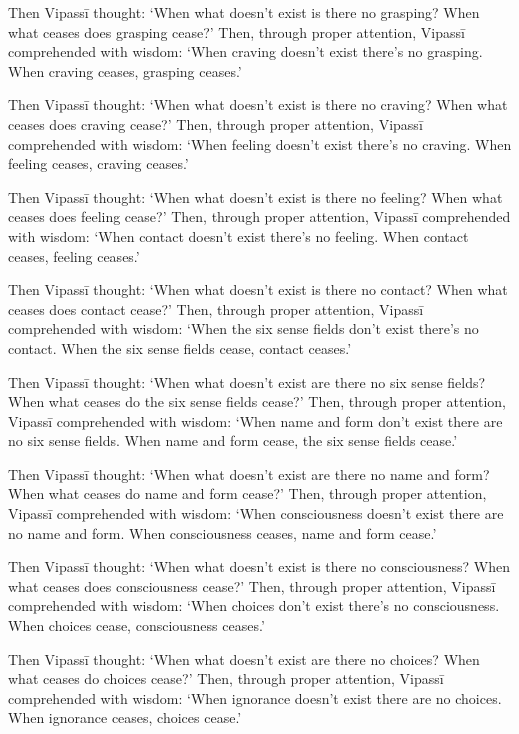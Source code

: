 \documentclass[12pt,openany]{book}%
\begin{document}
Then \textsanskrit{Vipassī} thought: ‘When what doesn’t exist is there no grasping? When what ceases does grasping cease?’ Then, through proper attention, \textsanskrit{Vipassī} comprehended with wisdom: ‘When craving doesn’t exist there’s no grasping. When craving ceases, grasping ceases.’ 

Then \textsanskrit{Vipassī} thought: ‘When what doesn’t exist is there no craving? When what ceases does craving cease?’ Then, through proper attention, \textsanskrit{Vipassī} comprehended with wisdom: ‘When feeling doesn’t exist there’s no craving. When feeling ceases, craving ceases.’ 

Then \textsanskrit{Vipassī} thought: ‘When what doesn’t exist is there no feeling? When what ceases does feeling cease?’ Then, through proper attention, \textsanskrit{Vipassī} comprehended with wisdom: ‘When contact doesn’t exist there’s no feeling. When contact ceases, feeling ceases.’ 

Then \textsanskrit{Vipassī} thought: ‘When what doesn’t exist is there no contact? When what ceases does contact cease?’ Then, through proper attention, \textsanskrit{Vipassī} comprehended with wisdom: ‘When the six sense fields don’t exist there’s no contact. When the six sense fields cease, contact ceases.’ 

Then \textsanskrit{Vipassī} thought: ‘When what doesn’t exist are there no six sense fields? When what ceases do the six sense fields cease?’ Then, through proper attention, \textsanskrit{Vipassī} comprehended with wisdom: ‘When name and form don’t exist there are no six sense fields. When name and form cease, the six sense fields cease.’ 

Then \textsanskrit{Vipassī} thought: ‘When what doesn’t exist are there no name and form? When what ceases do name and form cease?’ Then, through proper attention, \textsanskrit{Vipassī} comprehended with wisdom: ‘When consciousness doesn’t exist there are no name and form. When consciousness ceases, name and form cease.’ 

Then \textsanskrit{Vipassī} thought: ‘When what doesn’t exist is there no consciousness? When what ceases does consciousness cease?’ Then, through proper attention, \textsanskrit{Vipassī} comprehended with wisdom: ‘When choices don’t exist there’s no consciousness. When choices cease, consciousness ceases.’ 

Then \textsanskrit{Vipassī} thought: ‘When what doesn’t exist are there no choices? When what ceases do choices cease?’ Then, through proper attention, \textsanskrit{Vipassī} comprehended with wisdom: ‘When ignorance doesn’t exist there are no choices. When ignorance ceases, choices cease.’ 
\end{document}
